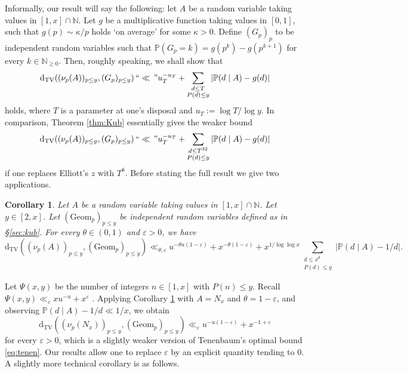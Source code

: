 \documentclass{article}
\theoremstyle{plain}
\newtheorem{cor}[thm]{Corollary}
\theoremstyle{remark}
\newcommand{\PP}{\mathbb{P}}
\newcommand{\NN}{\mathbb{N}}
\newcommand{\dtv}{\mathrm{d}_{\mathrm{TV}}}
\newcommand{\Geom}{\mathrm{Geom}}
\numberwithin{equation}{section}
\begin{document}
Informally, our result will say the following: let $A$ be a random variable taking values in $[1,x]\cap \NN$. Let $g$ be a multiplicative function taking values in $[0,1]$, such that $g(p)\sim \kappa/p$ holds `on average' for some $\kappa>0$. Define $(G_p)_p$ to be independent random variables such that $\PP(G_p=k)=g(p^k)-g(p^{k+1})$ for every $k\in \NN_{\ge 0}$. Then, roughly speaking, we shall show that
	\[	\dtv( (\nu_p(A))_{p\le y}, (G_p)_{p \le y})\, ``\ll \,"  u_T^{-u_T}+ \sum_{\substack{d\le T\\ P(d)\le y}} |\PP(d\mid A)-g(d)|\]
	holds, where $T$ is a parameter at one's disposal and $u_T:=\log T/\log y$. In comparison, Theorem \ref{thm:Kub} essentially gives the weaker bound
	\[	\dtv( (\nu_p(A))_{p\le y}, (G_p)_{p \le y})\, ``\ll \," u_T^{-u_T}+ \sum_{\substack{d\le T^{32}\\ P(d)\le y}} |\PP(d\mid A)-g(d)|\]
	if one replaces Elliott's $z$ with $T^{8}$. Before stating the full result we give two applications. 
\begin{cor}\label{cor:giden}
	Let $A$ be a random variable taking values in $[1,x]\cap \NN$. Let $y\in [2,x]$. Let $(\Geom_p)_{p\le y}$ be independent random variables defined as in \S\ref{sec:kub}. For every $\theta \in (0,1)$ and $\varepsilon>0$, we have
	\begin{equation}\label{eq:dtvgeom}
	\dtv( (\nu_p(A))_{p\le y}, (\Geom_p)_{p \le y}) \ll_{\theta,\varepsilon} u^{-\theta u(1-\varepsilon)}+x^{-\theta(1-\varepsilon)}+ x^{1/\log \log x}\sum_{\substack{d\le x^{\theta}\\ P(d)\le y}} |\PP(d\mid A)-1/d|.
\end{equation}
\end{cor}
Let $\Psi(x,y)$ be the number of integers $n \in [1,x]$ with $P(n)\le y$. Recall $\Psi(x,y)\ll_{\varepsilon} x u^{-u} + x^{\varepsilon}$ \cite[Ch.~III.5, Exercise 293(c)]{Ten}. Applying Corollary \ref{cor:giden} with $A=N_x$ and $\theta=1-\varepsilon$, and observing $\PP(d\mid A)-1/d \ll 1/x$, we obtain
\begin{equation}\label{eq:tenen2}
	\dtv( (\nu_p(N_x))_{p\le y}, (\Geom_p)_{p\le y})\ll_{\varepsilon}  u^{-u(1-\varepsilon)}+x^{-1+\varepsilon}
\end{equation}
for every $\varepsilon>0$, which is a slightly weaker version of Tenenbaum's optimal bound \eqref{eq:tenen}. Our results  allow one to replace $\varepsilon$ by an explicit quantity tending to $0$. A slightly more technical corollary is as follows.
\end{document}
